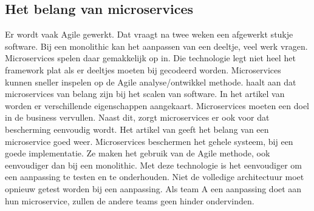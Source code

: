 \subsection{Het belang van microservices}
Er wordt vaak Agile gewerkt. Dat vraagt na twee weken een afgewerkt stukje software. Bij een monolithic kan het aanpassen van een deeltje, veel werk vragen. Microservices spelen daar gemakkelijk op in. Die technologie legt niet heel het framework plat als er deeltjes moeten bij gecodeerd worden. Microservices kunnen sneller inspelen op de Agile analyse/ontwikkel methode.
\textcite{series2018} haalt aan dat microservices van belang zijn bij het scalen van software.
In het artikel van \textcite{RDX2016} worden er verschillende eigenschappen aangekaart. Microservices moeten een doel in de business vervullen. Naast dit, zorgt microservices er ook voor dat bescherming eenvoudig wordt. 
Het artikel van \textcite{Watts2018} geeft het belang van een microservice goed weer. Microservices beschermen het gehele systeem, bij een goede implementatie. Ze maken het gebruik van de Agile methode, ook eenvoudiger dan bij een monolithic. Met deze technologie is het eenvoudiger om een aanpassing te testen en te onderhouden. Niet de volledige architectuur moet opnieuw getest worden bij een aanpassing. Als team A een aanpassing doet aan hun microservice, zullen de andere teams geen hinder ondervinden. 
